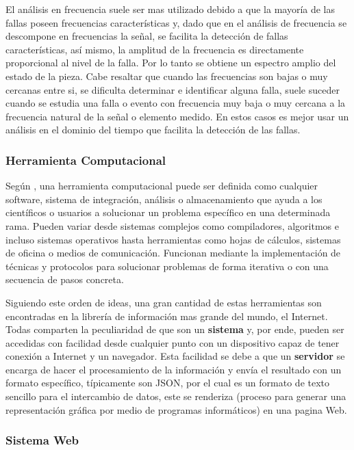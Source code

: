 El análisis en frecuencia suele ser mas utilizado debido a que
la mayoría de las fallas poseen frecuencias características y, dado que en  el
análisis de frecuencia se descompone en frecuencias la señal, se facilita la
detección de fallas características, así mismo, la amplitud de la frecuencia es
directamente proporcional al nivel de la falla. Por lo tanto se obtiene un
espectro amplio del estado de la pieza.
Cabe resaltar que cuando las frecuencias son bajas o muy cercanas entre si,
se dificulta determinar e identificar alguna falla, suele suceder cuando se
estudia una falla o evento con frecuencia muy baja o muy cercana a la frecuencia
natural de la señal o elemento medido. En estos casos es mejor
usar un análisis en el dominio del tiempo que  facilita la
detección de las fallas.



\subsubsection{Herramienta Computacional}


Según \Cite{Herramienta}, una herramienta computacional puede ser definida  como
cualquier software,
sistema de integración, análisis o almacenamiento que  ayuda a los científicos
o usuarios a solucionar un problema específico en una determinada rama. Pueden
variar desde sistemas complejos como compiladores, algoritmos
e incluso sistemas operativos hasta herramientas como hojas de cálculos, sistemas
de oficina o medios de comunicación. Funcionan mediante la implementación de
técnicas y protocolos para solucionar problemas de forma iterativa o con una
secuencia de pasos concreta.

Siguiendo este orden de ideas, una gran cantidad de estas herramientas son
encontradas en la librería de información mas grande del mundo, el Internet.
Todas comparten la peculiaridad de que son un \textbf{sistema} y,  por ende, pueden
ser accedidas con facilidad desde cualquier punto con un dispositivo capaz de
tener conexión a Internet y un navegador. Esta facilidad se debe a que un
\textbf{servidor} se encarga de hacer el procesamiento de la información y envía
el resultado con un formato específico, típicamente son  JSON, por  el cual es un formato de texto sencillo para el intercambio de
datos, este se renderiza (proceso para generar una representación gráfica por
medio de programas informáticos) en una pagina Web.

\subsubsection{Sistema Web}

